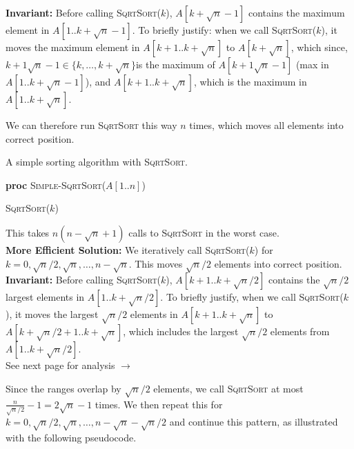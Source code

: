 \documentclass[letterpaper,11pt]{article}
\begin{document}
\begin{enumerate}
\begin{enumerate}
{\bf Invariant:} Before calling \textsc{SqrtSort}($k$), $A[k+\sqrt{n}-1]$ contains the maximum element in $A[1..k+\sqrt{n}-1]$. To briefly justify: when we call \textsc{SqrtSort}($k$), it moves the maximum element in $A[k+1..k+\sqrt{n}]$ to $A[k+\sqrt{n}]$, which since, $k+1\sqrt{n}-1\in \{k,\ldots,k+\sqrt{n}\}$is the maximum of $A[k+1\sqrt{n}-1]$ (max in $A[1..k+\sqrt{n}-1]$), and $A[k+1..k+\sqrt{n}]$, which is the maximum in $A[1..k+\sqrt{n}]$.

We can therefore run \textsc{SqrtSort} this way $n$ times, which moves all elements into correct position.

\begin{algorithm}[!htb]
\caption{A simple sorting algorithm with \textsc{SqrtSort}.}
{\bf proc} \textsc{Simple-SqrtSort}($A[1..n]$)
\begin{algorithmic}[1]
\State    \textsc{SqrtSort($k$)}
\EndFor
\EndFor
\end{algorithmic}
\label{algorithm:simple-sqrtsort}
\end{algorithm}

This takes $n(n-\sqrt{n}+1)$ calls to \textsc{SqrtSort} in the worst case.\\


{\bf More Efficient Solution:} We iteratively call \textsc{SqrtSort}($k$) for $k =0,\sqrt{n}/2,\sqrt{n},\ldots, n-\sqrt{n}$. This moves $\sqrt{n}/2$ elements into correct position.\\

{\bf Invariant:} Before calling \textsc{SqrtSort}($k$), $A[k+1..k+\sqrt{n}/2]$ contains the $\sqrt{n}/2$ largest elements in $A[1..k+\sqrt{n}/2]$. To briefly justify, when we call \textsc{SqrtSort}($k$), it moves the largest $\sqrt{n}/2$ elements in $A[k+1..k+\sqrt{n}]$ to $A[k+\sqrt{n}/2+1..k+\sqrt{n}]$, which includes the largest $\sqrt{n}/2$ elements from $A[1..k+\sqrt{n}/2]$.\\

\vfill{}
\hfill{}See next page for analysis $\rightarrow$

\newpage

Since the ranges overlap by $\sqrt{n}/2$ elements, we call \textsc{SqrtSort} at most $\frac{n}{\sqrt{n}/2}-1 = 2\sqrt{n}-1$ times. We then repeat this for $k =0,\sqrt{n}/2,\sqrt{n},\ldots, n-\sqrt{n}-\sqrt{n}/2$ and continue this pattern, as illustrated with the following pseudocode.\\


\end{enumerate}
\end{enumerate}
\end{document}
